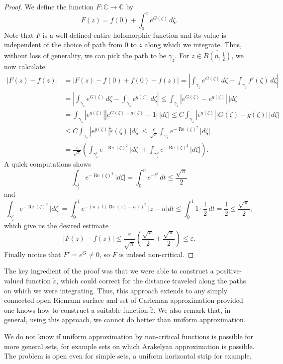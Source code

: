 \documentclass[a4paper,11pt]{amsart}
\newcommand{\C}{\mathbb C}
\newcommand{\abs}[1]{\left|#1\right|}
\DeclareMathOperator{\re}{Re}
\begin{document}
\begin{proof}
We define the function $F \colon \C \to \C$ by
\[F(z) = f(0) + \int_0^z e^{G(\zeta)} \, d\zeta.\]
Note that $F$ is a well-defined entire holomorphic function and its value is independent of the choice of path from $0$ to $z$ along which we integrate. Thus, without loss of generality, we can pick the path to be $\gamma_z$.
For $z \in \overline{B\left(n, \frac{1}{2}\right)}$, we now calculate
\begin{align*}
    \abs{F(z) - f(z)} &= \abs{F(z) - f(0) + f(0) - f(z)} = \abs{\int_{\gamma_z} e^{G(\zeta)} \, d\zeta - \int_{\gamma_z} f'(\zeta) \, d\zeta} \\
    &= \abs{\int_{\gamma_z} e^{G(\zeta)} \, d\zeta - \int_{\gamma_z} e^{g(\zeta)} \, d\zeta} \le \int_{\gamma_z} \abs{e^{G(\zeta)} - e^{g(\zeta)}} \, \abs{d\zeta} \\
    &= \int_{\gamma_z} \abs{e^{g(\zeta)}}\abs{e^{G(\zeta)-g(\zeta)} - 1} \, \abs{d\zeta} \le C \int_{\gamma_z} \abs{e^{g(\zeta)}}\abs{G(\zeta)-g(\zeta)} \, \abs{d\zeta} \\
    &\le C\int_{\gamma_z} \abs{e^{g(\zeta)}}\tilde{\varepsilon}(\zeta) \, \abs{d\zeta} \le \frac{\varepsilon}{\sqrt{\pi}} \int_{\gamma_z} e^{-\re(\zeta)^2} \, \abs{d\zeta} \\
    &= \frac{\varepsilon}{\sqrt{\pi}} \left(\int_{\gamma_z^1} e^{-\re(\zeta)^2} \, \abs{d\zeta} + \int_{\gamma_z^2} e^{-\re(\zeta)^2} \, \abs{d\zeta}\right).
\end{align*}
A quick computations shows
\[\int_{\gamma_z^1} e^{-\re(\zeta)^2} \, \abs{d\zeta} = \int_0^n e^{-t^2} \, dt \le \frac{\sqrt{\pi}}{2}\]
and 
\[\int_{\gamma_z^2} e^{-\re(\zeta)^2} \, \abs{d\zeta} = \int_0^1 e^{-(n + t(\re(z)-n))^2} \, \abs{z-n}dt \le \int_0^1 1 \cdot \frac{1}{2} \, dt = \frac{1}{2} \le \frac{\sqrt{\pi}}{2},\]
which give us the desired estimate 
\[\abs{F(z) - f(z)} \le \frac{\varepsilon}{\sqrt{\pi}} \left(\frac{\sqrt{\pi}}{2} + \frac{\sqrt{\pi}}{2}\right) \le \varepsilon.\]
Finally notice that $F' = e^{G} \neq 0$, so $F$ is indeed non-critical. 
\end{proof}

The key ingredient of the proof was that we were able to construct a positive-valued function $\tilde{\varepsilon}$, which could correct for the distance traveled along the paths on which we were integrating. 
Thus, this approach extends to any simply connected open Riemann surface and set of Carleman approximation provided one knows how to construct a suitable function $\tilde{\varepsilon}$. 
We also remark that, in general, using this approach, we cannot do better than uniform approximation.

We do not know if uniform approximation by non-critical functions is possible for more general sets, for example sets on which Arakelyan approximation is possible.
The problem is open even for simple sets, a uniform horizontal strip for example.

\nocite{*} 
\printbibliography
\end{document}
